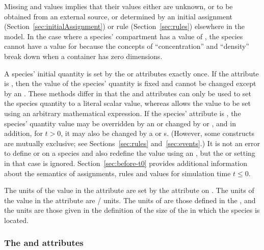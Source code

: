 Missing  and 
values implies that their values either are unknown, or to be
obtained from an external source, or determined by an initial
assignment (Section~\ref{sec:initialAssignment}) or rule
(Section~\ref{sec:rules}) elsewhere in the model.  In the case
where a species' compartment has a  value
of , the species cannot have a value for
 because the concepts of
``concentration'' and ``density'' break down when a container has
zero dimensions.

A species' initial quantity is set by the  or
 attributes exactly once.
If the  attribute is ,
then the value of the species' quantity
is fixed and cannot be changed except
by an \InitialAssignment.  These methods differ in that the
 and 
attributes can only be used to set the species quantity
to a literal scalar value, whereas \InitialAssignment allows the
value to be set using an arbitrary mathematical expression.  If
the species'  attribute is ,
the species' quantity value may be overridden by an
\InitialAssignment or changed by \AssignmentRule or
\AlgebraicRule, and in addition, for $t > 0$, it may also be
changed by a \RateRule or \Event{}s. (However, some constructs are
mutually exclusive; see Sections~\ref{sec:rules}
and~\ref{sec:events}.) It is not an error to define
 or  on a species
and also redefine the value using an \InitialAssignment, but the
 or  setting in
that case is ignored.  Section~\ref{sec:before-t0} provides
additional information about the semantics of assignments, rules
and values for simulation time $t \leq 0$.

The units of the value in the 
attribute are set by the 
attribute on \Species.  The units of the
value in the  attribute are
/ units.  The units of
 are those defined in the
, and the  units are those
given in the definition of the size of the \Compartment
  in which the species is located.


\subsubsection{The  and
     attributes}
\label{sec:species-units}

